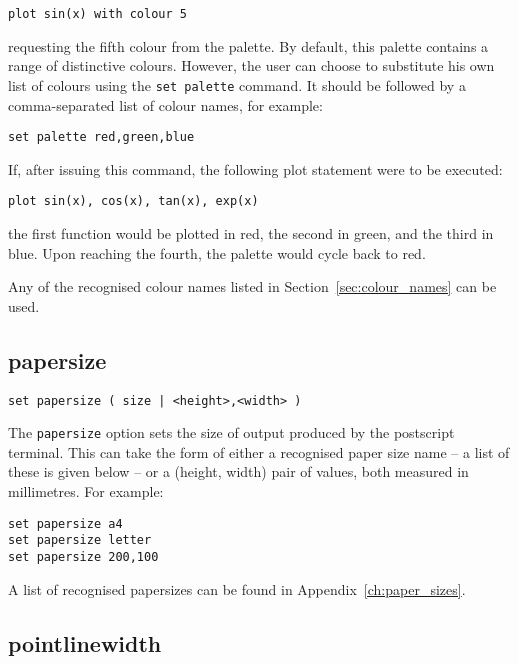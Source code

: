 \begin{verbatim}
plot sin(x) with colour 5
\end{verbatim}

\noindent requesting the fifth colour from the palette. By default, this palette
contains a range of distinctive colours. However, the user can choose to
substitute his own list of colours using the {\tt set palette} command. It
should be followed by a comma-separated list of colour names, for example:

\begin{verbatim}
set palette red,green,blue
\end{verbatim}

If, after issuing this command, the following plot statement were to be
executed:

\begin{verbatim}
plot sin(x), cos(x), tan(x), exp(x)
\end{verbatim}

\noindent the first function would be plotted in red, the second in green, and the third
in blue. Upon reaching the fourth, the palette would cycle back to red.

Any of the recognised colour names listed in Section~\ref{sec:colour_names} can be used.

\subsection{papersize}

\begin{verbatim}
set papersize ( size | <height>,<width> )
\end{verbatim}

The {\tt papersize} option sets the size of output produced by the postscript
terminal. This can take the form of either a recognised paper size name -- a
list of these is given below -- or a (height, width) pair of values, both measured
in millimetres. For example:

\begin{verbatim}
set papersize a4
set papersize letter
set papersize 200,100
\end{verbatim}

A list of recognised papersizes can be found in Appendix~\ref{ch:paper_sizes}.

\subsection{pointlinewidth}

